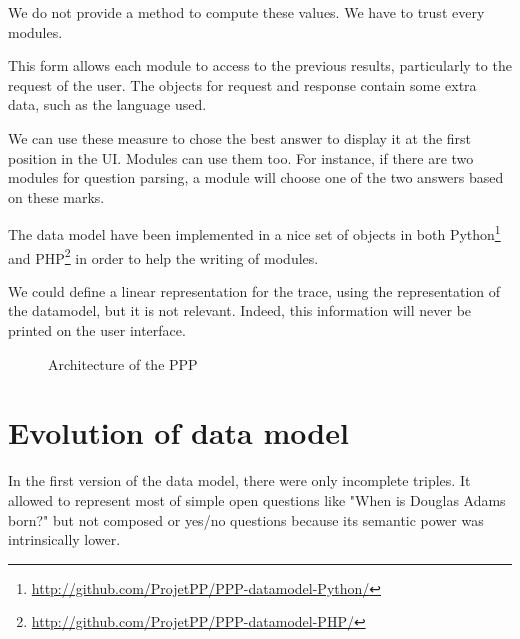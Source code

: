 We do not provide a method to compute these values. We have to trust every modules.

This form allows each module to access to the previous results, particularly to the request of the user. The objects for request and response contain some extra data, such as the language used.

We can use these measure to chose the best answer to display it at the first position in the UI. Modules can use them too. For instance, if there are two modules for question parsing, a module will choose one of the two answers based on these marks.

The data model have been implemented in a nice set of objects in both Python\footnote{\url{http://github.com/ProjetPP/PPP-datamodel-Python/}} and PHP\footnote{\url{http://github.com/ProjetPP/PPP-datamodel-PHP/}} in order to help the writing of modules.

We could define a linear representation for the trace, using the representation of the datamodel, but it is not relevant. Indeed, this information will never be printed on the user interface.

\begin{figure}[!ht]
    \centering
    \label{datamodel:struct}
    
    \caption{Architecture of the PPP}
\end{figure}

\FloatBarrier

\section{Evolution of data model}

In the first version of the data model, there were only incomplete triples. It allowed to represent most of simple open questions like "When is Douglas Adams born?" but not composed or yes/no questions because its semantic power was intrinsically lower.
